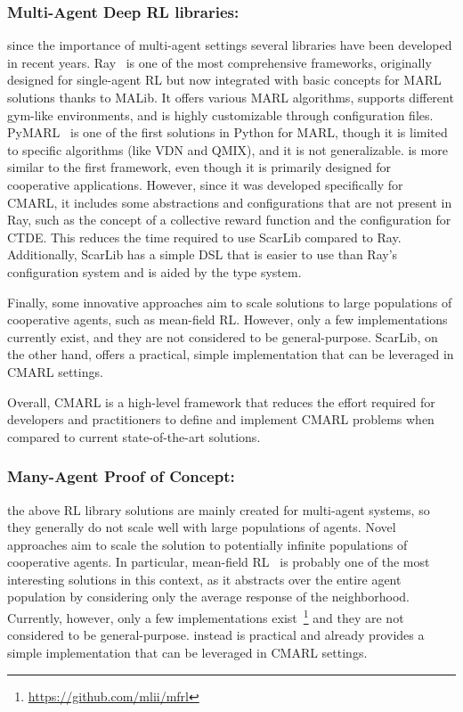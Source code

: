 \subsubsection{Multi-Agent Deep RL libraries:}
since the importance of multi-agent settings several libraries have been developed in recent years. 
Ray~\cite{ray} is one of the most comprehensive frameworks, 
 originally designed for single-agent RL but 
 now integrated with basic concepts for MARL solutions thanks to MALib. 
It offers various MARL algorithms,
 supports different gym-like environments, 
 and is highly customizable through configuration files. 
%
PyMARL~\cite{samvelyan19smac} is one of the first solutions in Python for MARL, 
 though it is limited to specific algorithms (like VDN and QMIX), 
 and it is not generalizable. 
%
\scarlib{} is more similar to the first framework, 
 even though it is primarily designed for cooperative applications. 
%
However, since it was developed specifically for CMARL, 
 it includes some abstractions and configurations that are not present in Ray, 
 such as the concept of a collective reward function and the configuration for CTDE. 
%
This reduces the time required to use ScarLib compared to Ray. 
 Additionally, ScarLib has a simple DSL that is easier to use than Ray's configuration system and is aided by the type system.

Finally, some innovative approaches aim to scale solutions to large populations of cooperative agents, such as mean-field RL. However, only a few implementations currently exist, and they are not considered to be general-purpose. ScarLib, on the other hand, offers a practical, simple implementation that can be leveraged in CMARL settings.

Overall, CMARL is a high-level framework that reduces the effort required for developers and practitioners to define and implement CMARL problems when compared to current state-of-the-art solutions.

\subsubsection{Many-Agent Proof of Concept:}
the above RL library solutions are mainly created for multi-agent systems, 
 so they generally do not scale well with large populations of agents. 
 Novel approaches aim to scale the solution to potentially infinite populations of cooperative agents. 
In particular, mean-field RL~\cite{meanfield} is probably one of the 
 most interesting solutions in this context, 
 as it abstracts over the entire agent population 
 by considering only the average response of the neighborhood. 
%
Currently, however, only a few implementations 
 exist~\footnote{\url{https://github.com/mlii/mfrl}} and they are not considered to be general-purpose. 
 \scarlib{} instead is practical and already provides a simple implementation that can be leveraged in CMARL settings. 
